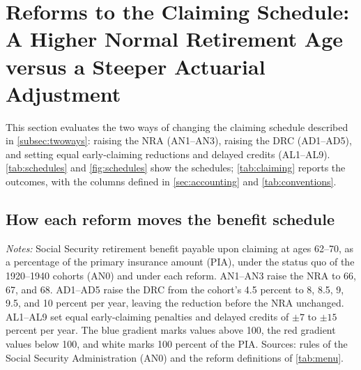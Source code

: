 \section{Reforms to the Claiming Schedule: A Higher Normal Retirement Age versus a Steeper Actuarial Adjustment}\label{sec:claiming}

This section evaluates the two ways of changing the claiming schedule described in \autoref{subsec:twoways}: raising the NRA (AN1--AN3), raising the DRC (AD1--AD5), and setting equal early-claiming reductions and delayed credits (AL1--AL9). \autoref{tab:schedules} and \autoref{fig:schedules} show the schedules; \autoref{tab:claiming} reports the outcomes, with the columns defined in \autoref{sec:accounting} and \autoref{tab:conventions}.

\subsection{How each reform moves the benefit schedule}\label{subsec:schedules}

\begin{table}[!t]
\centering
\caption{Benefit as a Percentage of the PIA by Claiming Age under a Higher Normal Retirement Age (AN), a Higher Delayed Retirement Credit (AD), and a Symmetric Adjustment (AL)}
\label{tab:schedules}
\vspace{6pt}
\scriptsize
\begin{threeparttable}

\begin{tablenotes}[flushleft]\scriptsize
\item[] \textit{Notes:} Social Security retirement benefit payable upon claiming at ages 62--70, as a percentage of the primary insurance amount (PIA), under the status quo of the 1920--1940 cohorts (AN0) and under each reform. AN1--AN3 raise the NRA to 66, 67, and 68. AD1--AD5 raise the DRC from the cohort's 4.5 percent to 8, 8.5, 9, 9.5, and 10 percent per year, leaving the reduction before the NRA unchanged. AL1--AL9 set equal early-claiming penalties and delayed credits of $\pm 7$ to $\pm 15$ percent per year. The blue gradient marks values above 100, the red gradient values below 100, and white marks 100 percent of the PIA. Sources: rules of the Social Security Administration (AN0) and the reform definitions of \autoref{tab:menu}.
\end{tablenotes}
\end{threeparttable}
\end{table}

